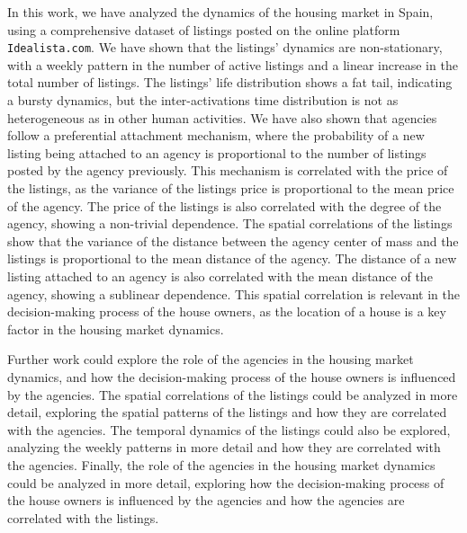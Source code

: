 In this work, we have analyzed the dynamics of the housing market in Spain, using a comprehensive dataset of listings posted on the online platform \texttt{Idealista.com}. We have shown that the listings' dynamics are non-stationary, with a weekly pattern in the number of active listings and a linear increase in the total number of listings. The listings' life distribution shows a fat tail, indicating a bursty dynamics, but the inter-activations time distribution is not as heterogeneous as in other human activities. We have also shown that agencies follow a preferential attachment mechanism, where the probability of a new listing being attached to an agency is proportional to the number of listings posted by the agency previously. This mechanism is correlated with the price of the listings, as the variance of the listings price is proportional to the mean price of the agency. The price of the listings is also correlated with the degree of the agency, showing a non-trivial dependence. The spatial correlations of the listings show that the variance of the distance between the agency center of mass and the listings is proportional to the mean distance of the agency. The distance of a new listing attached to an agency is also correlated with the mean distance of the agency, showing a sublinear dependence. This spatial correlation is relevant in the decision-making process of the house owners, as the location of a house is a key factor in the housing market dynamics.

Further work could explore the role of the agencies in the housing market dynamics, and how the decision-making process of the house owners is influenced by the agencies. The spatial correlations of the listings could be analyzed in more detail, exploring the spatial patterns of the listings and how they are correlated with the agencies. The temporal dynamics of the listings could also be explored, analyzing the weekly patterns in more detail and how they are correlated with the agencies. Finally, the role of the agencies in the housing market dynamics could be analyzed in more detail, exploring how the decision-making process of the house owners is influenced by the agencies and how the agencies are correlated with the listings.

